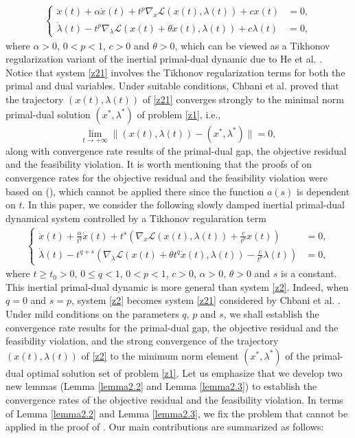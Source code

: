 \documentclass[review]{elsarticle}
\begin{document}
	\begin{eqnarray}\label{z21}
		\begin{cases}
			\ddot{x}(t)+\alpha\dot{x}(t)+t^p\nabla_{x}\mathcal{L}(x(t), \lambda(t))+cx(t)&=0,\\
			\dot{\lambda}(t)-t^{p}\nabla_{\lambda}\mathcal{L}(x(t)+\theta\dot{x}(t), \lambda(t))+c\lambda(t)&=0,
		\end{cases}
	\end{eqnarray}
where $\alpha>0$, $0<p<1$, $c>0$ and $\theta>0$, which can be viewed as  a Tikhonov regularization variant of  the inertial primal-dual dynamic due to He et al. \cite{HeHFetal(2022)}. Notice that system \eqref{z21} involves  the Tikhonov regularization terms  for both the primal and dual variables.
Under suitable conditions,  Chbani et al. \cite{ChbaniRBOn(2024)} proved that the trajectory $(x(t),\lambda(t))$ of  \eqref{z21} converges strongly to the minimal norm primal-dual solution $(x^*,\lambda^*)$ of  problem \eqref{z1}, i.e.,
$$\lim_{t\rightarrow+\infty}\|(x(t), \lambda(t))-(x^*,\lambda^*)\|=0,$$
 along with convergence rate results of the primal-dual gap, the objective residual and the feasibility violation. It is worth mentioning that the proofs of \cite[Theorem 3.2]{ChbaniRBOn(2024)} on convergence rates for  the objective residual and the feasibility violation were based on \cite[Lemma 6]{HeHFiietal(2022)} (\cite[Lemma 2.1]{ChbaniRBOn(2024)}),  which cannot be  applied there since the  function $a(s)$ is dependent on $t$.  In this paper, we  consider the following  slowly damped  inertial primal-dual dynamical system controlled by  a Tikhonov regularation term 
\begin{eqnarray}\label{z2}
		\begin{cases}
			\ddot{x}(t)+\frac{\alpha}{t^q}\dot{x}(t)+t^s\left(\nabla_{x}\mathcal{L}(x(t), \lambda(t))+\frac{c}{t^p}x(t)\right)&=0,\\
			\dot{\lambda}(t)-t^{q+s}\left(\nabla_{\lambda}\mathcal{L}(x(t)+\theta t^q\dot{x}(t), \lambda(t))-\frac{c}{t^p}\lambda(t)\right)&=0,
		\end{cases}
	\end{eqnarray}
	where $t\geq t_0>0$, $0\leq q<1$,  $0<p<1$, $c>0$, $\alpha>0$, $\theta>0$ and $s$ is a constant.  This inertial primal-dual dynamic is more general than system \eqref{z2}. Indeed, when $q=0$ and $s=p$, system \eqref{z2} becomes system \eqref{z21} considered by  Chbani et al. \cite{ChbaniRBOn(2024)}. Under mild conditions on the parameters $q$, $p$ and $s$, we shall establish the convergence rate results for the primal-dual gap, the objective residual and the feasibility violation, and the strong convergence of the trajectory $(x(t),\lambda(t))$ of \eqref{z2} to the minimum norm element $(x^*,\lambda^*)$ of the primal-dual optimal solution set of problem \eqref{z1}. Let us emphasize that we develop two new lemmas (Lemma  \ref{lemma2.2} and Lemma  \ref{lemma2.3})  to establish the convergence rates of the objective residual and the feasibility violation. In terms of Lemma  \ref{lemma2.2} and Lemma  \ref{lemma2.3}, we fix the problem that  \cite[Lemma 6]{HeHFiietal(2022)} cannot be applied in the proof of \cite[Theorem 3.2]{ChbaniRBOn(2024)}. Our main contributions are summarized as follows:
\end{document}
